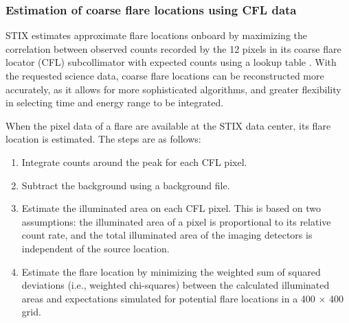 \documentclass[referee]{preaa} %
\begin{document}
\subsubsection{Estimation of coarse flare locations using CFL data}
STIX estimates approximate flare locations onboard by 
maximizing the correlation between observed counts recorded by the 12 pixels in its coarse flare locator (CFL) subcollimator with expected counts using a lookup table \citep{stix2020}. 
With the requested science data, coarse flare locations can be reconstructed more accurately, as it allows for more sophisticated algorithms, and greater flexibility in selecting time and energy range to be integrated. 

When the pixel data of a flare are available at the STIX data center, its flare location is estimated. 
The steps are as follows:
\begin{enumerate}
    \item Integrate counts around the peak for each CFL pixel.
    \item Subtract the background using a background file.
    \item Estimate the illuminated area on each CFL pixel.  This is based on two assumptions:  the illuminated area of a pixel is proportional to its relative count rate, and the total illuminated area of the imaging detectors is independent of the source location.
    \item Estimate the flare location by minimizing the weighted sum of squared deviations (i.e., weighted chi-squares) between the calculated illuminated areas and expectations simulated for potential flare locations in a 400 $\times$ 400 grid.
\end{enumerate}
\end{document}
